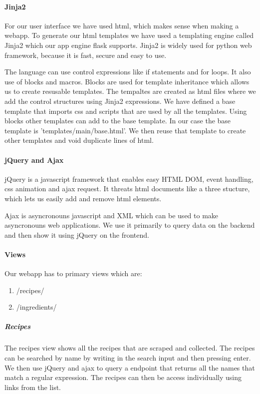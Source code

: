 \documentclass{article}
\begin{document}
\paragraph{Jinja2}
For our user interface we have used html, which makes sense when making a
webapp. To generate our html templates we have used a templating engine called
Jinja2 which our app engine flask supports. Jinja2 is widely used for python
web framework, because it is fast, secure and easy to use.

The language can use control expressions like if statements and for loops. It
also use of blocks and macros. Blocks are used for template inheritance which
allows us to create resusable templates. The tempaltes are created as html files
where we add the control structures using Jinja2 expressions. We have defined
a base template that imports css and scripts that are used by all the templates.
Using blocks other templates can add to the base template. In our case the base
template is 'templates/main/base.html'. We then reuse that template to create
other templates and void duplicate lines of html.

\paragraph{jQuery and Ajax}
jQuery is a javascript framework that enables easy HTML DOM, event handling,
css animation and ajax request. It threats html documents like a three stucture,
which lets us easily add and remove html elements. 

Ajax is asyncronouns javascript and XML which can be used to make asyncronouns
web applications. We use it primarily to query data on the backend and then show
it using jQuery on the frontend.

\paragraph{Views}
Our webapp has to primary views which are:
\begin{enumerate}
	\item /recipes/
	\item /ingredients/
\end{enumerate}
\subparagraph{Recipes}
The recipes view shows all the recipes that are scraped and collected. The
recipes can be searched by name by writing in the search input and then pressing
enter. We then use jQuery and ajax to query a endpoint that returns all the
names that match a regular expression. The recipes can then be access
individually using links from the list.
\end{document}
